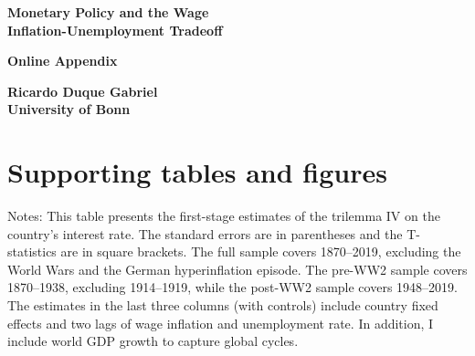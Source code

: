\documentclass[12pt]{article}
\newcommand{\annote}[1]{\parbox{\textwidth}{\renewcommand{\baselinestretch}{1.0}\vspace{12pt} \footnotesize Notes: #1}}
\begin{document}
\begin{appendices}

\setcounter{page}{1}
\setcounter{table}{0}
\setcounter{figure}{0}
\renewcommand{\thepage}{\roman{page}}
\renewcommand{\thetable}{\Alph{section}.\arabic{table}}
\renewcommand{\thefigure}{\Alph{section}.\arabic{figure}}
\renewcommand{\theequation}{\Alph{section}.\arabic{equation}}

\begin{titlepage}

\begin{center}
\textbf{\huge{Monetary Policy and the Wage \\ Inflation-Unemployment Tradeoff}}\\

\vspace{2em}

\textbf{\huge{Online Appendix}}\\

\vspace{2em}

\textbf{\Large{Ricardo Duque Gabriel \\ University of Bonn}}\\
\end{center}

\thispagestyle{empty}

\end{titlepage}

\section{Supporting tables and figures}




\clearpage



\clearpage



\clearpage



\begin{table}[ht]
\centering
\caption{First-Stage of trilemma IV} \label{T:First_Stage}
\vspace{1ex}
\def\sym#1{\ifmmode^{#1}\else\(^{#1}\)\fi}

\annote{This table presents the first-stage estimates of the trilemma IV on the country's interest rate. The standard errors are in parentheses and the T-statistics are in square brackets. The full sample covers 1870–2019, excluding the World Wars and the German hyperinflation episode. The pre-WW2 sample covers 1870–1938, excluding 1914–1919, while the post-WW2 sample covers 1948–2019. The estimates in the last three columns (with controls) include country fixed effects and two lags of wage inflation and unemployment rate. In addition, I include world GDP growth to capture global cycles.}
\end{table}


\end{appendices}
\end{document}
